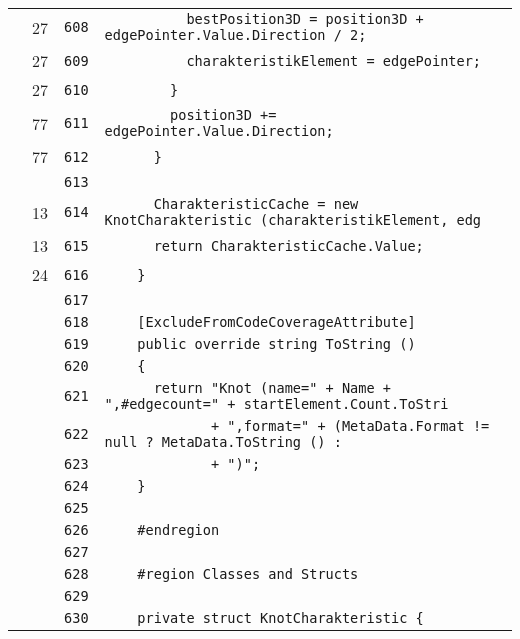 \documentclass[a4paper,10pt]{article}
\begin{document}
\begin{longtable}[l]{lrrl}
\cellcolor{green} & 27 & \verb~608~ & \verb~          bestPosition3D = position3D + edgePointer.Value.Direction / 2;~\\
\cellcolor{green} & 27 & \verb~609~ & \verb~          charakteristikElement = edgePointer;~\\
\cellcolor{green} & 27 & \verb~610~ & \verb~        }~\\
\cellcolor{green} & 77 & \verb~611~ & \verb~        position3D += edgePointer.Value.Direction;~\\
\cellcolor{green} & 77 & \verb~612~ & \verb~      }~\\
\cellcolor{gray} &  & \verb~613~ & \verb~~\\
\cellcolor{green} & 13 & \verb~614~ & \verb~      CharakteristicCache = new KnotCharakteristic (charakteristikElement, edg~\\
\cellcolor{green} & 13 & \verb~615~ & \verb~      return CharakteristicCache.Value;~\\
\cellcolor{green} & 24 & \verb~616~ & \verb~    }~\\
\cellcolor{gray} &  & \verb~617~ & \verb~~\\
\cellcolor{gray} &  & \verb~618~ & \verb~    [ExcludeFromCodeCoverageAttribute]~\\
\cellcolor{gray} &  & \verb~619~ & \verb~    public override string ToString ()~\\
\cellcolor{gray} &  & \verb~620~ & \verb~    {~\\
\cellcolor{gray} &  & \verb~621~ & \verb~      return "Knot (name=" + Name + ",#edgecount=" + startElement.Count.ToStri~\\
\cellcolor{gray} &  & \verb~622~ & \verb~             + ",format=" + (MetaData.Format != null ? MetaData.ToString () : ~\\
\cellcolor{gray} &  & \verb~623~ & \verb~             + ")";~\\
\cellcolor{gray} &  & \verb~624~ & \verb~    }~\\
\cellcolor{gray} &  & \verb~625~ & \verb~~\\
\cellcolor{gray} &  & \verb~626~ & \verb~    #endregion~\\
\cellcolor{gray} &  & \verb~627~ & \verb~~\\
\cellcolor{gray} &  & \verb~628~ & \verb~    #region Classes and Structs~\\
\cellcolor{gray} &  & \verb~629~ & \verb~~\\
\cellcolor{gray} &  & \verb~630~ & \verb~    private struct KnotCharakteristic {~\\

\end{longtable}
\end{document}

